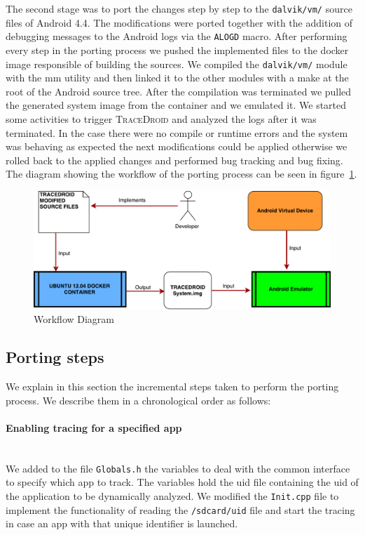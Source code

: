 The second stage was to port the changes step by step to the
\texttt{dalvik/vm/} source files of Android 4.4. The modifications were ported
together with the addition of debugging messages to the Android logs
via the \texttt{ALOGD} macro. After performing every step in the porting
process we pushed the implemented files to the docker image
responsible of building the sources. We compiled the \texttt{dalvik/vm/} module
with the mm utility and then linked it to the other modules with a
make at the root of the Android source tree. After the compilation was
terminated we pulled the generated system image from the container and
we emulated it. We started some activities to trigger \textsc{TraceDroid} and
analyzed the logs after it was terminated. In the case there were no
compile or runtime errors and the system was behaving as expected the
next modifications could be applied otherwise we rolled back to the
applied changes and performed bug tracking and bug fixing. The diagram
showing the workflow of the porting process can be seen in figure~\ref{fig:porting_workflow}.

\begin{figure}[!h]
    \centering
    \includegraphics[width=1\textwidth]{./img/porting/flowDiagram.pdf}
    \caption{Workflow Diagram}
    \label{fig:porting_workflow}
\end{figure}

\subsection{Porting steps}
\label{sec:porting_step}

We explain in this section the incremental steps taken to perform the
porting process. We describe them in a chronological order as follows:

\paragraph{Enabling tracing for a specified app} ~\\
We added to the file \texttt{Globals.h} the variables to deal with the
common interface to specify which app to track. The variables hold the
uid file containing the uid of the application to be dynamically
analyzed. We modified the \texttt{Init.cpp} file to implement the
functionality of reading the \texttt{/sdcard/uid} file and start the
tracing in case an app with that unique identifier is launched.


